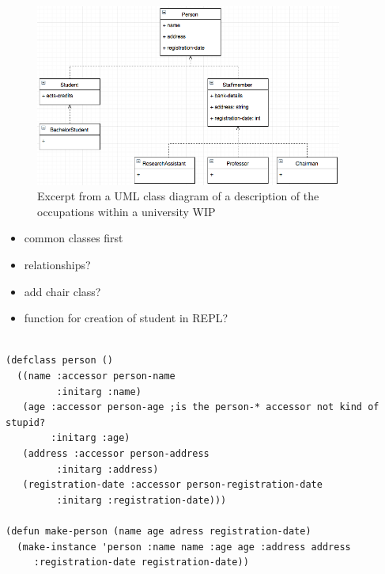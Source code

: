 \documentclass[oribibl]{llncs}
\begin{document}
\begin{figure}[]
    \centering
    \includegraphics[width=0.9\textwidth]{images/class-diagram.png}
    \caption{Excerpt from a UML class diagram of a description of the occupations within a university WIP}
    \label{fig:class-diagram}
\end{figure}


\begin{itemize}
\item common classes first
\item relationships?
\item add chair class?
\item function for creation of student in REPL?

\end{itemize}

\begin{listing}[]%
\begin{verbatim}

(defclass person ()
  ((name :accessor person-name
         :initarg :name)
   (age :accessor person-age ;is the person-* accessor not kind of stupid?
        :initarg :age)
   (address :accessor person-address
         :initarg :address)
   (registration-date :accessor person-registration-date
         :initarg :registration-date)))

(defun make-person (name age adress registration-date)
  (make-instance 'person :name name :age age :address address
     :registration-date registration-date))
     
\end{verbatim}
\caption{The basic \texttt{person} class WIP}
\label{lst:clossyntax}
\end{listing}
\end{document}
